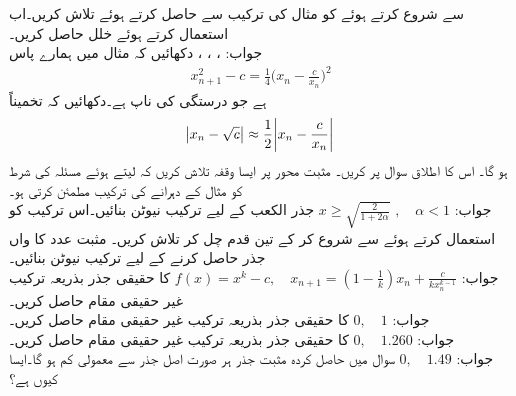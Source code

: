 \quad
{} سے شروع کرتے ہوئے  کو مثال  کی ترکیب سے حاصل کرتے ہوئے  تلاش کریں۔اب  استعمال کرتے ہوئے خلل حاصل کریں۔\\
جواب:\quad
{}، ، ،
\quad
دکھائیں کہ مثال  میں ہمارے پاس
\begin{align*}
x^2_{n+1}-c=\frac{1}{4}\big(x_n-\frac{c}{x_n}\big)^2
\end{align*}
ہے جو درستگی کی ناپ ہے۔دکھائیں کہ تخمیناً
\begin{align*}
\abs{x_n-\sqrt{c}}\approx \frac{1}{2}\abs{x_n-\frac{c}{x_n}}
\end{align*}
ہو گا۔ اس کا اطلاق سوال  پر کریں۔
\quad
مثبت محور  پر ایسا وقفہ تلاش کریں کہ  لیتے ہوئے مسئلہ  کی شرط کو  مثال  کے دہرانے کی ترکیب مطمئن کرتی ہو۔ \\
جواب:\quad
$x\ge \sqrt{\tfrac{2}{1+2\alpha}}\,\,,\quad \alpha<1$
\quad
جذر الکعب کے لیے ترکیب نیوٹن بنائیں۔اس ترکیب کو استعمال کرتے ہوئے  سے شروع کر کے تین قدم چل کر   تلاش کریں۔
\quad
مثبت عدد  کا  واں جذر حاصل کرنے کے لیے ترکیب نیوٹن بنائیں۔\\
جواب:\quad
$f(x)=x^k-c,\quad x_{n+1}=(1-\tfrac{1}{k})x_n+\tfrac{c}{kx_n^{k-1}}$
\quad
{} کا حقیقی جذر بذریعہ ترکیب غیر حقیقی مقام حاصل کریں۔ \\
جواب:\quad
$0,\quad 1$
\quad
{} کا حقیقی جذر بذریعہ ترکیب غیر حقیقی مقام حاصل کریں۔ \\
جواب:\quad
$0,\quad 1.260$
\quad
{} کا حقیقی جذر بذریعہ ترکیب غیر حقیقی مقام حاصل کریں۔ \\
جواب:\quad
$0,\quad 1.49$
\quad
سوال  میں حاصل کردہ مثبت جذر ہر صورت اصل جذر سے معمولی کم ہو گا۔ایسا کیوں ہے؟
